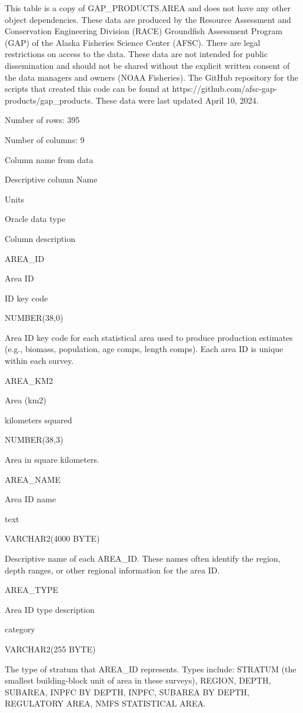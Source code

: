 \documentclass[
  letterpaper,
  oneside,
  open=any]{scrbook}
\begin{document}
This table is a copy of GAP\_PRODUCTS.AREA and does not have any other
object dependencies. These data are produced by the Resource Assessment
and Conservation Engineering Division (RACE) Groundfish Assessment
Program (GAP) of the Alaska Fisheries Science Center (AFSC). There are
legal restrictions on access to the data. These data are not intended
for public dissemination and should not be shared without the explicit
written consent of the data managers and owners (NOAA Fisheries). The
GitHub repository for the scripts that created this code can be found at
https://github.com/afsc-gap-products/gap\_products. These data were last
updated April 10, 2024.

Number of rows: 395

Number of columns: 9

Column name from data

Descriptive column Name

Units

Oracle data type

Column description

AREA\_ID

Area ID

ID key code

NUMBER(38,0)

Area ID key code for each statistical area used to produce production
estimates (e.g., biomass, population, age comps, length comps). Each
area ID is unique within each survey.

AREA\_KM2

Area (km2)

kilometers squared

NUMBER(38,3)

Area in square kilometers.

AREA\_NAME

Area ID name

text

VARCHAR2(4000 BYTE)

Descriptive name of each AREA\_ID. These names often identify the
region, depth ranges, or other regional information for the area ID.

AREA\_TYPE

Area ID type description

category

VARCHAR2(255 BYTE)

The type of stratum that AREA\_ID represents. Types include: STRATUM
(the smallest building-block unit of area in these surveys), REGION,
DEPTH, SUBAREA, INPFC BY DEPTH, INPFC, SUBAREA BY DEPTH, REGULATORY
AREA, NMFS STATISTICAL AREA.
\end{document}
